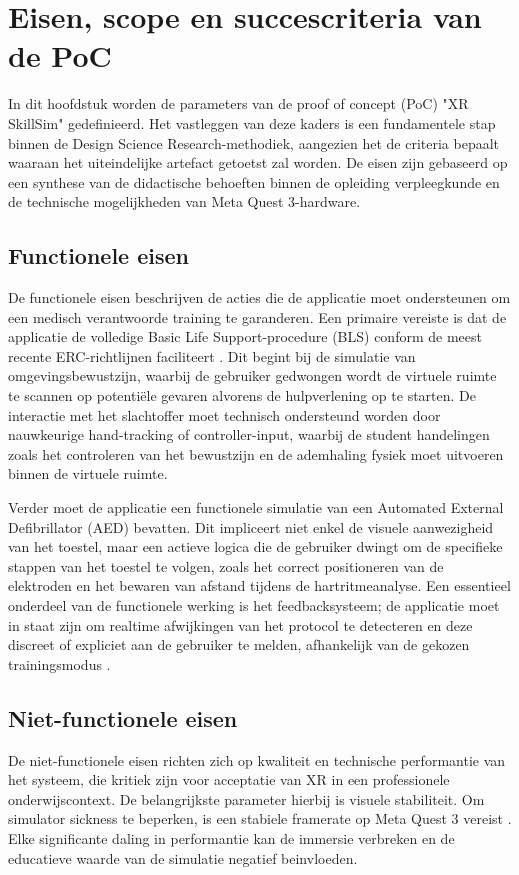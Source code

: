 \chapter{Eisen, scope en succescriteria van de PoC}
\label{ch:eisen-scope}
 
 In dit hoofdstuk worden de parameters van de proof of concept (PoC) "XR SkillSim" gedefinieerd. Het vastleggen van deze kaders is een fundamentele stap binnen de Design Science Research-methodiek, aangezien het de criteria bepaalt waaraan het uiteindelijke artefact getoetst zal worden. De eisen zijn gebaseerd op een synthese van de didactische behoeften binnen de opleiding verpleegkunde en de technische mogelijkheden van Meta Quest 3-hardware.
 
 \section{Functionele eisen}
 De functionele eisen beschrijven de acties die de applicatie moet ondersteunen om een medisch verantwoorde training te garanderen. Een primaire vereiste is dat de applicatie de volledige Basic Life Support-procedure (BLS) conform de meest recente ERC-richtlijnen faciliteert \cite{ERC2025BLS}. Dit begint bij de simulatie van omgevingsbewustzijn, waarbij de gebruiker gedwongen wordt de virtuele ruimte te scannen op potentiële gevaren alvorens de hulpverlening op te starten. De interactie met het slachtoffer moet technisch ondersteund worden door nauwkeurige hand-tracking of controller-input, waarbij de student handelingen zoals het controleren van het bewustzijn en de ademhaling fysiek moet uitvoeren binnen de virtuele ruimte.
 
 Verder moet de applicatie een functionele simulatie van een Automated External Defibrillator (AED) bevatten. Dit impliceert niet enkel de visuele aanwezigheid van het toestel, maar een actieve logica die de gebruiker dwingt om de specifieke stappen van het toestel te volgen, zoals het correct positioneren van de elektroden en het bewaren van afstand tijdens de hartritmeanalyse. Een essentieel onderdeel van de functionele werking is het feedbacksysteem; de applicatie moet in staat zijn om realtime afwijkingen van het protocol te detecteren en deze discreet of expliciet aan de gebruiker te melden, afhankelijk van de gekozen trainingsmodus \cite{Radianti2020VRHE}.
 
 \section{Niet-functionele eisen}
 De niet-functionele eisen richten zich op kwaliteit en technische performantie van het systeem, die kritiek zijn voor acceptatie van XR in een professionele onderwijscontext. De belangrijkste parameter hierbij is visuele stabiliteit. Om simulator sickness te beperken, is een stabiele framerate op Meta Quest 3 vereist \cite{Lampropoulos2025VR}. Elke significante daling in performantie kan de immersie verbreken en de educatieve waarde van de simulatie negatief beinvloeden.
 
